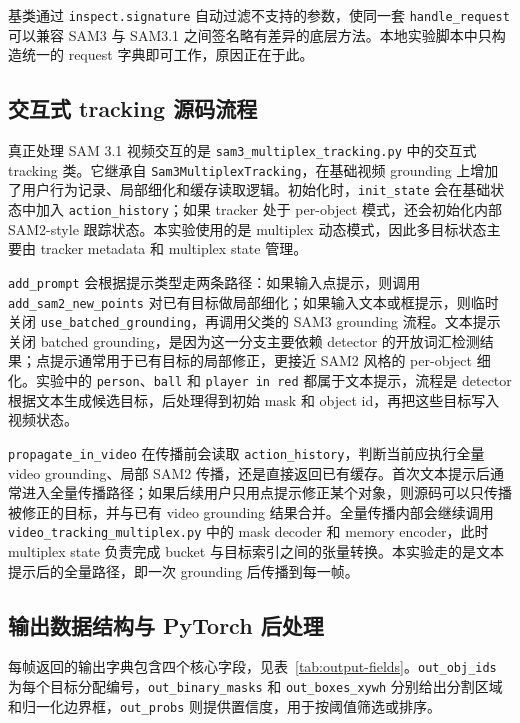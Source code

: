 \documentclass[UTF8,a4paper,zihao=-4,fontset=none]{ctexart}
\begin{document}
基类通过 \texttt{inspect.signature} 自动过滤不支持的参数，使同一套 \texttt{handle\_request} 可以兼容 SAM3 与 SAM3.1 之间签名略有差异的底层方法。本地实验脚本中只构造统一的 request 字典即可工作，原因正在于此。

\subsection{交互式 tracking 源码流程}

真正处理 SAM 3.1 视频交互的是 \texttt{sam3\_multiplex\_tracking.py} 中的交互式 tracking 类。它继承自 \texttt{Sam3MultiplexTracking}，在基础视频 grounding 上增加了用户行为记录、局部细化和缓存读取逻辑。初始化时，\texttt{init\_state} 会在基础状态中加入 \texttt{action\_history}；如果 tracker 处于 per-object 模式，还会初始化内部 SAM2-style 跟踪状态。本实验使用的是 multiplex 动态模式，因此多目标状态主要由 tracker metadata 和 multiplex state 管理。

\texttt{add\_prompt} 会根据提示类型走两条路径：如果输入点提示，则调用 \texttt{add\_sam2\_new\_points} 对已有目标做局部细化；如果输入文本或框提示，则临时关闭 \texttt{use\_batched\_grounding}，再调用父类的 SAM3 grounding 流程。文本提示关闭 batched grounding，是因为这一分支主要依赖 detector 的开放词汇检测结果；点提示通常用于已有目标的局部修正，更接近 SAM2 风格的 per-object 细化。实验中的 \texttt{person}、\texttt{ball} 和 \texttt{player in red} 都属于文本提示，流程是 detector 根据文本生成候选目标，后处理得到初始 mask 和 object id，再把这些目标写入视频状态。

\texttt{propagate\_in\_video} 在传播前会读取 \texttt{action\_history}，判断当前应执行全量 video grounding、局部 SAM2 传播，还是直接返回已有缓存。首次文本提示后通常进入全量传播路径；如果后续用户只用点提示修正某个对象，则源码可以只传播被修正的目标，并与已有 video grounding 结果合并。全量传播内部会继续调用 \texttt{video\_tracking\_multiplex.py} 中的 mask decoder 和 memory encoder，此时 multiplex state 负责完成 bucket 与目标索引之间的张量转换。本实验走的是文本提示后的全量路径，即一次 grounding 后传播到每一帧。

\subsection{输出数据结构与 PyTorch 后处理}

每帧返回的输出字典包含四个核心字段，见表~\ref{tab:output-fields}。\texttt{out\_obj\_ids} 为每个目标分配编号，\texttt{out\_binary\_masks} 和 \texttt{out\_boxes\_xywh} 分别给出分割区域和归一化边界框，\texttt{out\_probs} 则提供置信度，用于按阈值筛选或排序。
\end{document}
